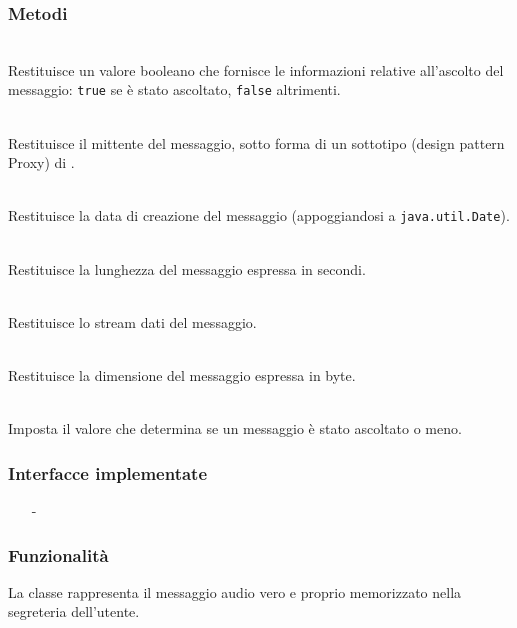 \subsubsection*{Metodi}
\begin{description}
	\item{}\\
Restituisce un valore booleano che fornisce le informazioni relative all'ascolto del messaggio: \texttt{true} se è stato ascoltato, \texttt{false} altrimenti.
	\item{}\\
Restituisce il mittente del messaggio, sotto forma di un sottotipo (design pattern Proxy) di .
	\item{}\\
Restituisce la data di creazione del messaggio (appoggiandosi a \texttt{java.util.Date}).
	\item{}\\
Restituisce la lunghezza del messaggio espressa in secondi.
	\item{}\\
Restituisce lo stream dati del messaggio.
	\item{}\\
Restituisce la dimensione del messaggio espressa in byte.
	\item{}\\
Imposta il valore che determina se un messaggio è stato ascoltato o meno.

\end{description}


\subsubsection*{Interfacce implementate}
\begin{itemize}[noitemsep,nolistsep]
  \item[-] 
\end{itemize}

\subsubsection*{Funzionalità}
La classe rappresenta il messaggio audio vero e proprio memorizzato nella segreteria dell'utente.

